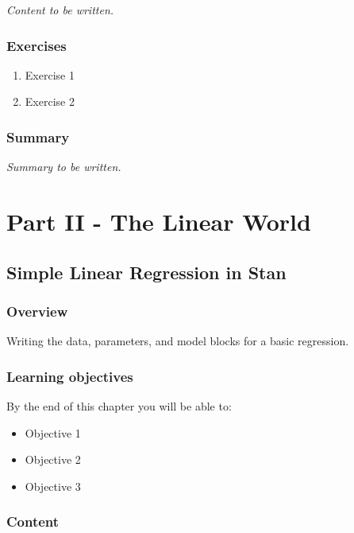 \documentclass[
  11pt,
  a4paper,
  oneside,
  openany]{scrbook}
\providecommand{\tightlist}{%
  \setlength{\itemsep}{0pt}\setlength{\parskip}{0pt}}\usepackage{longtable,booktabs,array}
\begin{document}
\emph{Content to be written.}

\section{Exercises}\label{exercises-2}

\begin{enumerate}
\def\labelenumi{\arabic{enumi}.}
\tightlist
\item
  Exercise 1
\item
  Exercise 2
\end{enumerate}

\section{Summary}\label{summary-2}

\emph{Summary to be written.}

\part{Part II - The Linear World}

\chapter{Simple Linear Regression in
Stan}\label{simple-linear-regression-in-stan}

\section{Overview}\label{overview-3}

Writing the data, parameters, and model blocks for a basic regression.

\section{Learning objectives}\label{learning-objectives-3}

By the end of this chapter you will be able to:

\begin{itemize}
\tightlist
\item[$\square$]
  Objective 1
\item[$\square$]
  Objective 2
\item[$\square$]
  Objective 3
\end{itemize}

\section{Content}\label{content-2}
\end{document}
